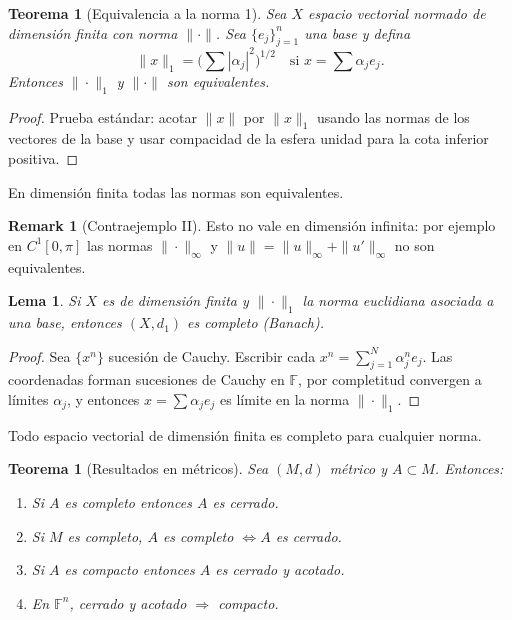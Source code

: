 \documentclass[11pt]{article}
\theoremstyle{definition}
\newtheorem{remark}[definition]{Remark}
\theoremstyle{plain}
\newtheorem{lemma}[definition]{Lema}
\newtheorem{theorem}[definition]{Teorema}
\begin{document}
\begin{theorem}[Equivalencia a la norma 1]
Sea $X$ espacio vectorial normado de dimensión finita con norma $\|\cdot\|$. Sea $\{e_j\}_{j=1}^n$ una base y defina
\[\|x\|_1=\Big(\sum|\alpha_j|^2\Big)^{1/2}\quad\text{si }x=\sum\alpha_j e_j.\]
Entonces $\|\cdot\|_1$ y $\|\cdot\|$ son equivalentes.
\end{theorem}
\begin{proof}
Prueba estándar: acotar $\|x\|$ por $\|x\|_1$ usando las normas de los vectores de la base y usar compacidad de la esfera unidad para la cota inferior positiva.
\end{proof}

\begin{corollary}
En dimensión finita todas las normas son equivalentes.
\end{corollary}

\begin{remark}[Contraejemplo II]
Esto no vale en dimensión infinita: por ejemplo en $C^1[0,\pi]$ las normas $\|\cdot\|_\infty$ y $\|u\|=\|u\|_\infty+\|u'\|_\infty$ no son equivalentes.
\end{remark}

\begin{lemma}
Si $X$ es de dimensión finita y $\|\cdot\|_1$ la norma euclidiana asociada a una base, entonces $(X,d_1)$ es completo (Banach).
\end{lemma}
\begin{proof}
Sea $\{x^n\}$ sucesión de Cauchy. Escribir cada $x^n=\sum_{j=1}^N\alpha_j^n e_j$. Las coordenadas forman sucesiones de Cauchy en $\mathbb{F}$, por completitud convergen a límites $\alpha_j$, y entonces $x=\sum\alpha_j e_j$ es límite en la norma $\|\cdot\|_1$.
\end{proof}

\begin{corollary}
Todo espacio vectorial de dimensión finita es completo para cualquier norma.
\end{corollary}

\begin{theorem}[Resultados en métricos]
Sea $(M,d)$ métrico y $A\subset M$. Entonces:
\begin{enumerate}[label=(\arabic*)]
\item Si $A$ es completo entonces $A$ es cerrado.
\item Si $M$ es completo, $A$ es completo $\iff A$ es cerrado.
\item Si $A$ es compacto entonces $A$ es cerrado y acotado.
\item En $\mathbb{F}^n$, cerrado y acotado $\Rightarrow$ compacto.
\end{enumerate}
\end{theorem}
\end{document}
